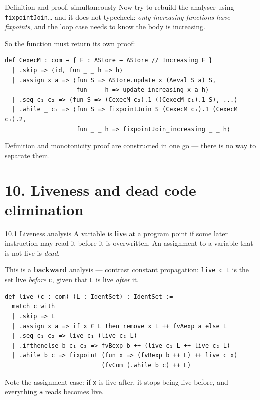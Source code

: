 \documentclass[aspectratio=169,10pt]{beamer}
\newcommand{\code}[1]{\texttt{\small #1}}
\begin{document}
\begin{frame}[fragile]{Definition and proof, simultaneously}
Now try to rebuild the analyser using \code{fixpointJoin}\ldots{} and it does
not typecheck: \emph{only increasing functions have fixpoints}, and the loop
case needs to know the body is increasing.
\medskip

So the function must return its own proof:
\begin{lstlisting}
def CexecM : com → { F : AStore → AStore // Increasing F }
  | .skip => ⟨id, fun _ _ h => h⟩
  | .assign x a => ⟨fun S => AStore.update x (Aeval S a) S,
                    fun _ _ h => update_increasing x a h⟩
  | .seq c₁ c₂ => ⟨fun S => (CexecM c₂).1 ((CexecM c₁).1 S), ...⟩
  | .while _ c₁ => ⟨fun S => fixpointJoin S (CexecM c₁).1 (CexecM c₁).2,
                    fun _ _ h => fixpointJoin_increasing _ _ h⟩
\end{lstlisting}
Definition and monotonicity proof are constructed in one go --- there is no
way to separate them.
\end{frame}

\section{10. Liveness and dead code elimination}

\begin{frame}[fragile]{10.1 Liveness analysis}
A variable is \textbf{live} at a program point if some later instruction may
read it before it is overwritten.  An assignment to a variable that is not
live is \emph{dead}.
\medskip

This is a \textbf{backward} analysis --- contrast constant propagation:
\code{live c L} is the set live \emph{before} \code{c}, given that \code{L}
is live \emph{after} it.
\begin{lstlisting}
def live (c : com) (L : IdentSet) : IdentSet :=
  match c with
  | .skip => L
  | .assign x a => if x ∈ L then remove x L ++ fvAexp a else L
  | .seq c₁ c₂ => live c₁ (live c₂ L)
  | .ifthenelse b c₁ c₂ => fvBexp b ++ (live c₁ L ++ live c₂ L)
  | .while b c => fixpoint (fun x => (fvBexp b ++ L) ++ live c x)
                           (fvCom (.while b c) ++ L)
\end{lstlisting}
Note the assignment case: if \code{x} is live after, it stops being live
before, and everything \code{a} reads becomes live.
\end{frame}
\end{document}
